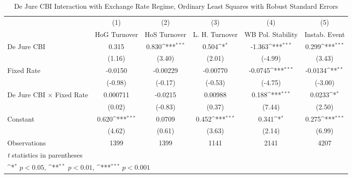 \begin{table}[htbp]\centering
\def\sym#1{\ifmmode^{#1}\else\(^{#1}\)\fi}
\caption{De Jure CBI Interaction with Exchange Rate Regime, Ordinary Least Squares with Robust Standard Errors \label{imultIndOLSDJ}}
\begin{tabular}{l*{5}{c}}
\toprule
                                        &\multicolumn{1}{c}{(1)}&\multicolumn{1}{c}{(2)}&\multicolumn{1}{c}{(3)}&\multicolumn{1}{c}{(4)}&\multicolumn{1}{c}{(5)}\\
                                        &\multicolumn{1}{c}{HoG Turnover}&\multicolumn{1}{c}{HoS Turnover}&\multicolumn{1}{c}{L. H. Turnover}&\multicolumn{1}{c}{WB Pol. Stability}&\multicolumn{1}{c}{Instab. Event}\\
\midrule
De Jure CBI                             &    0.315         &    0.830\sym{***}&    0.504\sym{*}  &   -1.363\sym{***}&    0.299\sym{***}\\
                                        &   (1.16)         &   (3.40)         &   (2.01)         &  (-4.99)         &   (3.43)         \\
\addlinespace
Fixed Rate                              &  -0.0150         & -0.00229         & -0.00770         &  -0.0745\sym{***}&  -0.0134\sym{**} \\
                                        &  (-0.98)         &  (-0.17)         &  (-0.53)         &  (-4.75)         &  (-3.00)         \\
\addlinespace
De Jure CBI $\times$ Fixed Rate         & 0.000711         &  -0.0215         &  0.00988         &    0.188\sym{***}&   0.0233\sym{*}  \\
                                        &   (0.02)         &  (-0.83)         &   (0.37)         &   (7.44)         &   (2.50)         \\
\addlinespace
Constant                                &    0.620\sym{***}&   0.0709         &    0.452\sym{***}&    0.341\sym{*}  &    0.275\sym{***}\\
                                        &   (4.62)         &   (0.61)         &   (3.63)         &   (2.14)         &   (6.99)         \\
\midrule
Observations                            &     1399         &     1399         &     1141         &     2141         &     4207         \\
\bottomrule
\multicolumn{6}{l}{\footnotesize \textit{t} statistics in parentheses}\\
\multicolumn{6}{l}{\footnotesize \sym{*} \(p<0.05\), \sym{**} \(p<0.01\), \sym{***} \(p<0.001\)}\\
\end{tabular}
\end{table}
